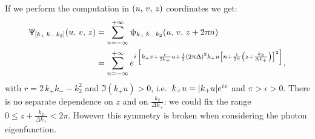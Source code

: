If we perform the computation in $\qty(u,\, v,\, z)$ coordinates we get:
\begin{equation}
  \begin{split}
    \Psi_{\qty[k_+\, k_-\, k_2]}\qty(u,\, v,\, z)
    & =
    \infinfsum{n}
    \psi_{k_+\, k_-\, k_2}\qty(u,\, v,\, z + 2 \pi n)
    \\
    & =
    \infinfsum{n}
    e^{%
      i\, \qty[%
        k_+ v
        +
        \frac{r}{2 k_+} u
        +
        \frac{1}{2} \qty(2 \pi \Delta)^2 k_+ u
        \qty[ n + \frac{1}{2\pi} \qty( z + \frac{k_2}{\Delta k_+} ) ]^2
      ]
    },
  \end{split}
\end{equation}
with $r = 2\, k_+ k_- - k_2^2$ and $\Im(k_+ u) > 0$, i.e.\ $k_+ u = \abs{k_+ u} e^{i \upepsilon}$ and $\pi > \epsilon > 0$.
There is no separate dependence on $z$ and on $\frac{k_2}{\Delta k_+}$: we could fix the range $0 \le z + \frac{k_2}{\Delta k_+} < 2\pi$.
However this symmetry is broken when considering the photon eigenfunction.

